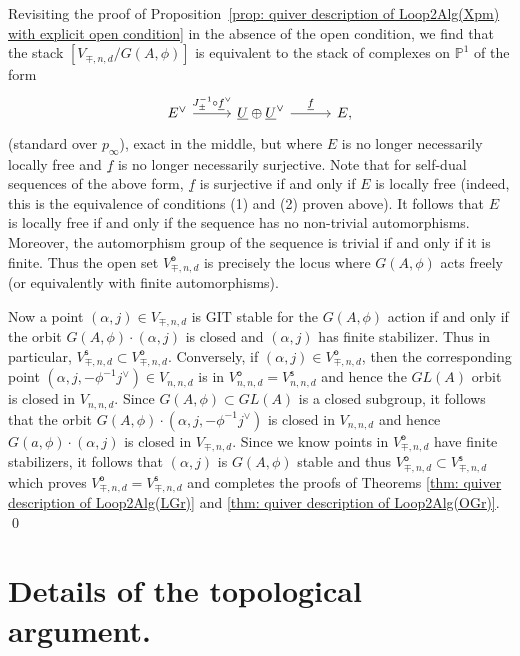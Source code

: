 \documentclass{amsart}
\theoremstyle{definition}
\newcommand{\PP}{\mathbb{P}}
\newcommand{\UL}[1]{\underline{#1}}
\newcommand{\open}{\mathsf{o}}
\newcommand{\stable}{\mathsf{s}}
\begin{document}
Revisiting the proof of Proposition~\ref{prop: quiver description of
Loop2Alg(Xpm) with explicit open condition} in the absence of the open
condition, we find that the stack $[V_{\mp ,n,d} / G(A,\phi )]$ is
equivalent to the stack of complexes on $\PP^{1}$ of the form
\[
\begin{tikzcd}[column sep={6em,between origins}]
E^{\vee } \arrow[r, "J_{\pm }^{-1}\circ \UL{f}^{\vee}"] &
\UL{U}\oplus \UL{U}^{\vee } \arrow[r, "\UL{f}"] & E,
\end{tikzcd}
\]
(standard over $p_{\infty}$), exact in the middle, but where $E$ is no
longer necessarily locally free and $\UL{f}$ is no longer necessarily
surjective. Note that for self-dual sequences of the above form,
$\UL{f}$ is surjective if and only if $E$ is locally free (indeed,
this is the equivalence of conditions (1) and (2) proven above). It
follows that $E$ is locally free if and only if the sequence has no
non-trivial automorphisms. Moreover, the automorphism group of the
sequence is trivial if and only if it is finite. Thus the open set
$V^{\open}_{\mp ,n,d}$ is precisely the locus where $G(A,\phi )$ acts
freely (or equivalently with finite automorphisms).

Now a point $(\alpha ,j)\in V_{\mp ,n,d}$ is GIT stable for the
$G(A,\phi )$ action if and only if the orbit $G(A,\phi )\cdot (\alpha
,j)$ is closed and $(\alpha ,j)$ has finite stabilizer. Thus in
particular, $V^{\stable}_{\mp ,n,d}\subset V^{\open}_{\mp
,n,d}$. Conversely, if $(\alpha ,j)\in V^{\open}_{\mp ,n,d}$, then the
corresponding point $(\alpha ,j,-\phi^{-1}j^{\vee})\in V_{n,n,d}$ is in
$V^{\open}_{n,n,d}=V^{\stable}_{n,n,d}$ and hence the $GL(A)$ orbit is
closed in $V_{n,n,d}$. Since $G(A,\phi )\subset GL(A)$ is a closed
subgroup, it follows that the orbit $G(A,\phi )\cdot (\alpha
,j,-\phi^{-1}j^{\vee})$ is closed in $V_{n,n,d}$ and hence $G(a,\phi
)\cdot (\alpha ,j)$ is closed in $V_{\mp ,n,d}$. Since we know points
in $V^{\open}_{\mp ,n,d}$ have finite stabilizers, it follows that
$(\alpha ,j)$ is $G(A,\phi )$ stable and thus $V^{\open}_{\mp
,n,d}\subset V^{\stable }_{\mp ,n,d}$ which proves $V^{\open}_{\mp
,n,d}=V^{\stable }_{\mp ,n,d}$ and completes the proofs of Theorems
\ref{thm: quiver description of Loop2Alg(LGr)} and \ref{thm: quiver
description of Loop2Alg(OGr)}. \qed 

\section{Details of the topological argument.}\label{sec: topological details}
\end{document}
